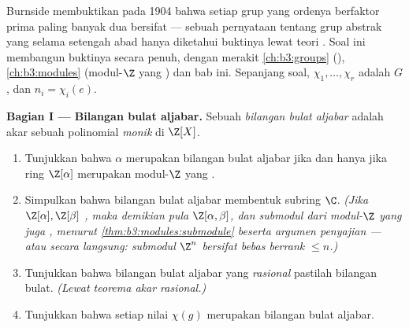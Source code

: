 \begin{problem}\label{pb:b3:representations:1}
Burnside membuktikan pada 1904 bahwa setiap grup yang ordenya berfaktor prima
paling banyak dua bersifat  --- sebuah pernyataan tentang grup
abstrak yang selama setengah abad hanya diketahui buktinya lewat
teori . Soal ini membangun buktinya secara penuh, dengan
merakit \cref{ch:b3:groups} (),
\cref{ch:b3:modules} (modul-$\Z$ yang ) dan bab
ini. Sepanjang soal, $\chi_1, \dots, \chi_r$ adalah  
$G$, dan $n_i = \chi_i(e)$.

\medskip
\noindent\textbf{Bagian I --- Bilangan bulat aljabar.} Sebuah
\emph{bilangan bulat aljabar} adalah akar sebuah polinomial \emph{monik}
di $\Z[X]$.
\begin{enumerate}
  \item Tunjukkan bahwa $\alpha$ merupakan bilangan bulat aljabar jika dan hanya jika ring
        $\Z[\alpha]$ merupakan modul-$\Z$ yang .
  \item Simpulkan bahwa bilangan bulat aljabar membentuk subring
        $\C$. \emph{(Jika $\Z[\alpha], \Z[\beta]$ , maka demikian pula $\Z[\alpha, \beta]$, dan submodul dari
        modul-$\Z$ yang  juga ,
        menurut \cref{thm:b3:modules:submodule} beserta argumen penyajian
        --- atau secara langsung: submodul $\Z^n$ bersifat bebas
        berrank $\leq n$.)}
  \item Tunjukkan bahwa bilangan bulat aljabar yang \emph{rasional} pastilah
        bilangan bulat. \emph{(Lewat teorema akar rasional.)}
  \item Tunjukkan bahwa setiap nilai  $\chi(g)$ merupakan
        bilangan bulat aljabar.
\end{enumerate}


\end{problem}
